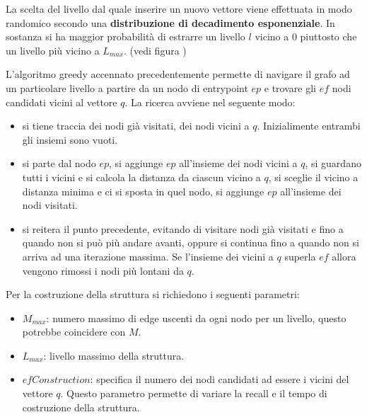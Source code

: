 \begin{nota}
    La scelta del livello dal quale inserire un nuovo vettore viene effettuata 
    in modo randomico secondo una \textbf{distribuzione di decadimento esponenziale}. 
    In sostanza si ha maggior probabilità di estrarre un livello $l$ vicino a $0$ 
    piuttosto che un livello più vicino a $L_{max}$. (vedi figura \cite{exp_decay})
\end{nota}

\begin{nota}
    L'algoritmo greedy accennato precedentemente permette di navigare il grafo 
    ad un particolare livello a partire da un nodo di entrypoint $ep$ e trovare gli $ef$ 
    nodi candidati vicini al vettore $q$. 
    La ricerca avviene nel seguente modo:
    \begin{itemize}
        \item si tiene traccia dei nodi già visitati, dei nodi vicini a $q$. Inizialimente 
        entrambi gli insiemi sono vuoti.
        \item si parte dal nodo $ep$, si aggiunge $ep$ all'insieme dei nodi vicini a $q$,
        si guardano tutti i vicini e si calcola la distanza da ciascun vicino a $q$,
        si sceglie il vicino a distanza minima e ci si sposta in quel nodo, si 
        aggiunge $ep$ all'insieme dei nodi visitati.
        \item si reitera il punto precedente, evitando di visitare nodi già visitati e
        fino a quando non si può più andare avanti, oppure si continua fino a quando 
        non si arriva ad una iterazione massima. Se l'insieme dei vicini a $q$
        superla $ef$ allora vengono rimossi i nodi più lontani da $q$.
    \end{itemize} 
\end{nota}

Per la costruzione della struttura si richiedono i seguenti parametri:
\begin{itemize}
    \item $M_{max}$: numero massimo di edge uscenti da ogni nodo per un livello, questo 
    potrebbe coincidere con $M$.
    \item $L_{max}$: livello massimo della struttura.
    \item $efConstruction$: specifica il numero dei nodi candidati ad essere i vicini 
    del vettore $q$. Questo parametro permette di variare la recall e il tempo di 
    costruzione della struttura.
\end{itemize} 



